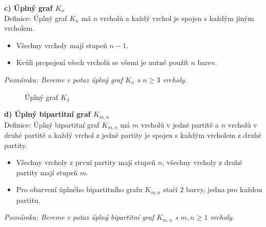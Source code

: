 \documentclass[10pt, a4paper]{ReportSheet}
\begin{document}
    \textbf{c) Úplný graf $K_n$}\\
    Definice: Úplný graf $K_n$ má $n$ vrcholů a každý vrchol je spojen s každým jiným vrcholem.

    \begin{itemize}
        \item Všechny vrcholy mají stupeň $n-1$.
        \item Kvůli propojení všech vrcholů se všemi je nutné použít $n$ barev.
    \end{itemize}
    \textit{Poznámka: Bereme v potaz úplný graf $K_n$ s $n \geq 3$ vrcholy.}

    \begin{figure}[H]
        \centering
        \caption{Úplný graf $K_4$}
        \label{fig:ukol-2-1c-uplny-graf}
    \end{figure}


    \textbf{d) Úplný bipartitní graf $K_{m,n}$}\\
    Definice: Úplný bipartitní graf $K_{m,n}$ má $m$ vrcholů v jedné partitě a $n$ vrcholů v druhé partitě a každý vrchol z jedné partity je spojen s každým vrcholem z druhé partity.

    \begin{itemize}
        \item Všechny vrcholy z první partity mají stupeň $n$, všechny vrcholy z druhé partity mají stupeň $m$.
        \item Pro obarvení úplného bipartitního grafu $K_{m,n}$ stačí 2 barvy, jedna pro každou partitu.
    \end{itemize}
    \textit{Poznámka: Bereme v potaz úplný bipartitní graf $K_{m,n}$ s $m,n \geq 1$ vrcholy.}
\end{document}
